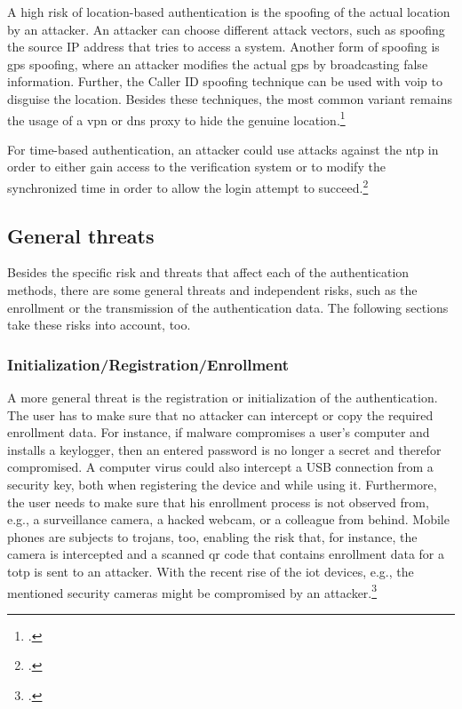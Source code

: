 A high risk of location-based authentication is the spoofing of the actual location by an attacker. An attacker can choose different attack vectors, such as spoofing the source IP address that tries to access a system. Another form of spoofing is \gls{gps} spoofing, where an attacker modifies the actual \gls{gps} by broadcasting false information. Further, the Caller ID spoofing technique can be used with \gls{voip} to disguise the location. Besides these techniques, the most common variant remains the usage of a \gls{vpn} or \gls{dns} proxy to hide the genuine location.\footcites[See][138--145]{517355}[See][Chapter 4.5.3]{30270}[See][115--116,133]{eckert-it-sec-9}

For time-based authentication, an attacker could use attacks against the \gls{ntp} in order to either gain access to the verification system or to modify the synchronized time in order to allow the login attempt to succeed.\footcite[See][]{malhotraattacking}

\subsection{General threats}

Besides the specific risk and threats that affect each of the authentication methods, there are some general threats and independent risks, such as the enrollment or the transmission of the authentication data. The following sections take these risks into account, too.

\subsubsection{Initialization/Registration/Enrollment}

A more general threat is the registration or initialization of the authentication. The user has to make sure that no attacker can intercept or copy the required enrollment data. For instance, if malware compromises a user’s computer and installs a keylogger, then an entered password is no longer a secret and therefor compromised. A computer virus could also intercept a USB connection from a security key, both when registering the device and while using it. Furthermore, the user needs to make sure that his enrollment process is not observed from, e.g., a surveillance camera, a hacked webcam, or a colleague from behind. Mobile phones are subjects to trojans, too, enabling the risk that, for instance, the camera is intercepted and a scanned \gls{qr} code that contains enrollment data for a \gls{totp} is sent to an attacker. With the recent rise of the \gls{iot} devices, e.g., the mentioned security cameras might be compromised by an attacker.\footcites[See][152--153]{10.1007/978-3-642-39235-1_9}[See][61]{Ulqinaku:2019:FPP:3317549.3323404}[See][371--375]{10.1007/978-3-662-45472-5_24}

